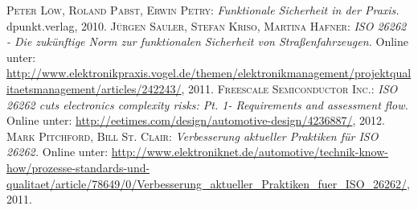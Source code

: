 \documentclass[a4paper,DIV=calc,ngerman]{scrartcl}
\begin{document}
\begin{thebibliography}{------}
\label{sec:Literatur}

 \textsc{Peter Löw, Roland Pabst, Erwin Petry}: {\em Funktionale Sicherheit in der Praxis.} dpunkt.verlag, 2010.
 \textsc{Jürgen Sauler, Stefan Kriso, Martina Hafner}: {\em ISO 26262 - Die zukünftige Norm zur funktionalen Sicherheit von Straßenfahrzeugen.} Online unter: \url{http://www.elektronikpraxis.vogel.de/themen/elektronikmanagement/projektqualitaetsmanagement/articles/242243/}, 2011.
 \textsc{Freescale Semiconductor Inc.}: {\em ISO 26262 cuts electronics complexity risks: Pt. 1- Requirements and assessment flow.} Online unter: \url{http://eetimes.com/design/automotive-design/4236887/}, 2012.
 \textsc{Mark Pitchford, Bill St. Clair}: {\em Verbesserung aktueller Praktiken für ISO 26262.} Online unter: \url{http://www.elektroniknet.de/automotive/technik-know-how/prozesse-standards-und-qualitaet/article/78649/0/Verbesserung_aktueller_Praktiken_fuer_ISO_26262/}, 2011.





\end{thebibliography}
\end{document}
